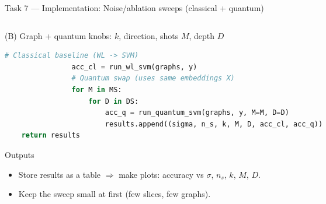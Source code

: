 \documentclass[aspectratio=169,xcolor={dvipsnames}]{beamer}
\begin{document}
\begin{frame}[fragile,shrink=52]{Task 7 — Implementation: Noise/ablation sweeps (classical + quantum)}
\begin{columns}[T,onlytextwidth]
\begin{column}{0.48\textwidth}
\begin{block}{(B) Graph + quantum knobs: $k$, direction, shots $M$, depth $D$}
\begin{lstlisting}[language=Python]
                # Classical baseline (WL -> SVM)
                acc_cl = run_wl_svm(graphs, y)    
                # Quantum swap (uses same embeddings X)
                for M in MS:
                    for D in DS:
                        acc_q = run_quantum_svm(graphs, y, M=M, D=D)   
                        results.append((sigma, n_s, k, M, D, acc_cl, acc_q))
    return results
\end{lstlisting}
\end{block}

\begin{block}{Outputs}
\footnotesize
\begin{itemize}\setlength\itemsep{2pt}
\item Store results as a table $\Rightarrow$ make plots:
accuracy vs $\sigma$, $n_s$, $k$, $M$, $D$.
\item Keep the sweep small at first (few slices, few graphs).
\end{itemize}
\end{block}
\end{column}

\end{columns}
\end{frame}
\end{document}
